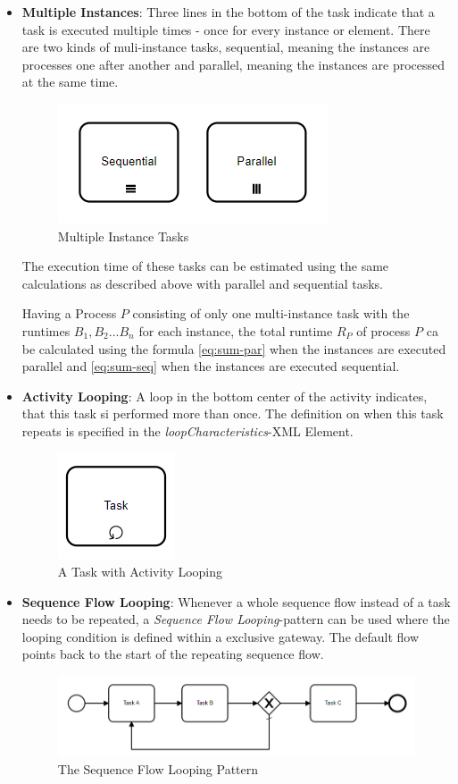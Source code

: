 \begin{itemize}
	
	\item \textbf{Multiple Instances}: Three lines in the bottom of the task indicate that a task is executed multiple times - once for every instance or element. There are two kinds of muli-instance tasks, sequential, meaning the instances are processes one after another and parallel, meaning the instances are processed at the same time. 
	\begin{figure}[H]
		\centering
		\includegraphics[width=0.4\columnwidth]{graphics/multi-instance-tasks}
		\caption{Multiple Instance Tasks} 
		\label{fig:muliti-instance-tasks} 
	\end{figure}
	The execution time of these tasks can be estimated using the same calculations as described above with parallel and sequential tasks.
	
	Having a Process $P$ consisting of only one multi-instance task with the runtimes $B_1,B_2 ... B_n$ for each instance, the total runtime $R_P$ of process $P$ ca be calculated using the formula \ref{eq:sum-par} when the instances are executed parallel and \ref{eq:sum-seq} when the instances are executed sequential. 

	\item \textbf{Activity Looping}: A loop in the bottom center of the activity indicates, that this task si performed more than once. The definition on when this task repeats is specified in the \textit{loopCharacteristics}-XML Element.
	\begin{figure}[H]
		\centering
		\includegraphics[width=0.2\columnwidth]{graphics/looped-task}
		\caption{A Task with Activity Looping} 
		\label{fig:activity-looping} 
	\end{figure}
	\item \textbf{Sequence Flow Looping}: Whenever a whole sequence flow instead of a task needs to be repeated, a \textit{Sequence Flow Looping}-pattern can be used where the looping condition is defined within a exclusive gateway. The default flow points back to the start of the repeating sequence flow. 
	\begin{figure}[H]
		\centering
		\includegraphics[width=0.9\columnwidth]{graphics/sequence-flow-looping}
		\caption{The Sequence Flow Looping Pattern} 
		\label{fig:sequence-flow-looping} 
	\end{figure}


\end{itemize}
